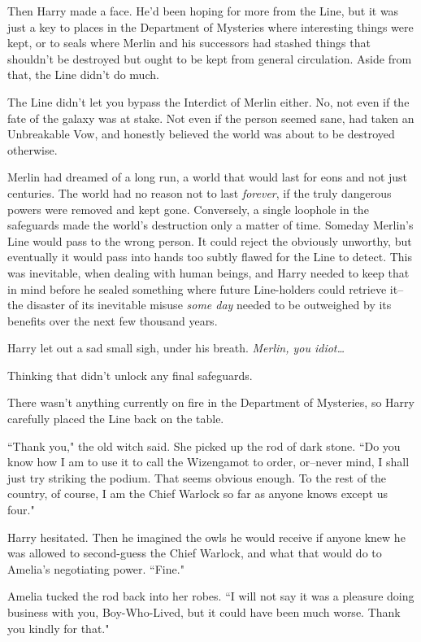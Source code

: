 Then Harry made a face. He'd been hoping for more from the Line, but it was just a key to places in the Department of Mysteries where interesting things were kept, or to seals where Merlin and his successors had stashed things that shouldn't be destroyed but ought to be kept from general circulation. Aside from that, the Line didn't do much.

The Line didn't let you bypass the Interdict of Merlin either. No, not even if the fate of the galaxy was at stake. Not even if the person seemed sane, had taken an Unbreakable Vow, and honestly believed the world was about to be destroyed otherwise.

Merlin had dreamed of a long run, a world that would last for eons and not just centuries. The world had no reason not to last \emph{forever}, if the truly dangerous powers were removed and kept gone. Conversely, a single loophole in the safeguards made the world's destruction only a matter of time. Someday Merlin's Line would pass to the wrong person. It could reject the obviously unworthy, but eventually it would pass into hands too subtly flawed for the Line to detect. This was inevitable, when dealing with human beings, and Harry needed to keep that in mind before he sealed something where future Line-holders could retrieve it\---the disaster of its inevitable misuse \emph{some day} needed to be outweighed by its benefits over the next few thousand years.

Harry let out a sad small sigh, under his breath. \emph{Merlin, you idiot{\ldots}}

Thinking that didn't unlock any final safeguards.

There wasn't anything currently on fire in the Department of Mysteries, so Harry carefully placed the Line back on the table.

``Thank you," the old witch said. She picked up the rod of dark stone. ``Do you know how I am to use it to call the Wizengamot to order, or\---never mind, I shall just try striking the podium. That seems obvious enough. To the rest of the country, of course, I am the Chief Warlock so far as anyone knows except us four."

Harry hesitated. Then he imagined the owls he would receive if anyone knew he was allowed to second-guess the Chief Warlock, and what that would do to Amelia's negotiating power. ``Fine."

Amelia tucked the rod back into her robes. ``I will not say it was a pleasure doing business with you, Boy-Who-Lived, but it could have been much worse. Thank you kindly for that."

